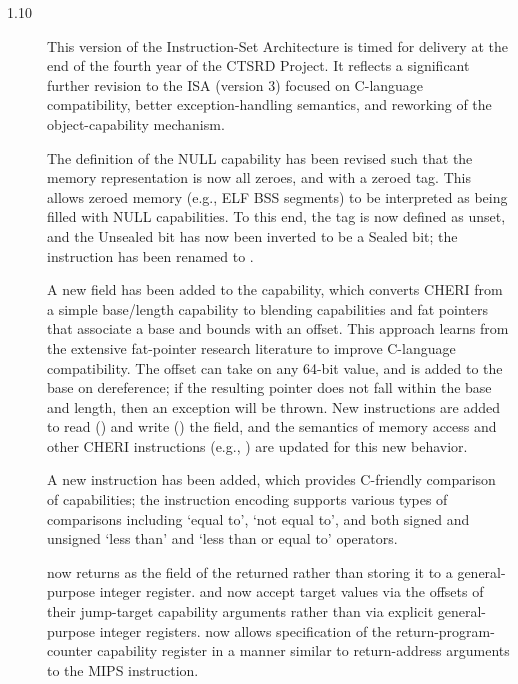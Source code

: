 \begin{description}
\item[1.10]
  This version of the Instruction-Set Architecture is timed for delivery at
  the end of the fourth year of the CTSRD Project.  It reflects a significant
  further revision to the ISA (version 3) focused on C-language compatibility,
  better exception-handling semantics, and reworking of the object-capability
  mechanism.

  The definition of the NULL capability has been revised such that the memory
  representation is now all zeroes, and with a zeroed tag.  This allows
  zeroed memory (e.g., ELF BSS segments) to be interpreted as being filled
  with NULL capabilities.  To this end, the tag is now defined as unset, and
  the Unsealed bit has now been inverted to be a Sealed bit; the
   instruction has been renamed to
  .

  A new \coffset{} field has been added to the capability, which converts CHERI
  from a simple base/length capability to blending capabilities and fat
  pointers that associate a base and bounds with an offset.
  This approach learns from the extensive fat-pointer research literature to
  improve C-language compatibility.
  The offset can take on any 64-bit value, and is added to the base on
  dereference; if the resulting pointer does not fall within the base and
  length, then an exception will be thrown.
  New instructions are added to read () and write
  () the
  field, and the semantics of memory access and other CHERI instructions
  (e.g., ) are updated for this new behavior.

  A new  instruction has been added, which provides
  C-friendly
  comparison of capabilities; the instruction encoding supports various types
  of comparisons including `equal to', `not equal to', and both signed and
  unsigned `less than' and `less than or equal to' operators.

   now returns \PC{} as the \coffset{} field of the
  returned \PCC{} rather than storing it to a general-purpose integer register.
   and  now accept target \PC{} values
  via the offsets of their
  jump-target capability arguments rather than via explicit general-purpose
  integer registers.
   now allows specification of the return-program-counter
  capability register in a manner similar to return-address arguments to the
  MIPS  instruction.


\end{description}
